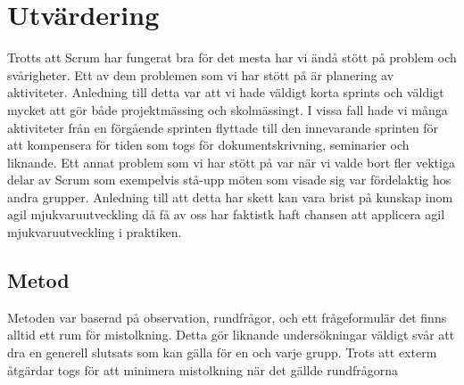 \section{Utvärdering}
Trotts att Scrum har fungerat bra för det mesta har vi ändå stött på problem och svårigheter. Ett av dem problemen som vi har stött på är planering av aktiviteter. Anledning till detta var att vi hade väldigt korta sprints och väldigt mycket att gör både projektmässing och skolmässingt. I vissa fall hade vi många aktiviteter från en förgående sprinten flyttade till den innevarande sprinten för att kompensera för tiden som togs för dokumentskrivning, seminarier och liknande. Ett annat problem som vi har stött på var när vi valde bort fler vektiga delar av Scrum som exempelvis stå-upp möten som visade sig var fördelaktig hos andra grupper. Anledning till att detta har skett kan vara brist på kunskap inom agil mjukvaruutveckling då få av oss har faktistk haft chansen att applicera agil mjukvaruutveckling i praktiken. 

\subsection{Metod}
Metoden var baserad på observation, rundfrågor, och ett frågeformulär det finns alltid ett rum för mistolkning. Detta gör liknande undersökningar väldigt svår att dra en generell slutsats som kan gälla för en och varje grupp. Trots att exterm åtgärdar togs för att minimera mistolkning när det gällde rundfrågorna 